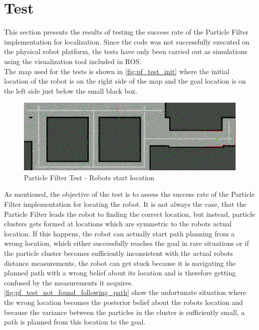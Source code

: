 
\section{Test} %
\label{sec:test}

This section presents the results of testing the success rate of the Particle Filter implementation for localization. Since the code was not successfully executed on the physical robot platform, the tests have only been carried out as simulations using the visualization tool included in ROS.\\

The map used for the tests is shown in \autoref{fig:pf_test_init} where the initial location of the robot is on the right side of the map and the goal location is on the left side just below the small black box.\\

\begin{figure}[H]
\centering
\includegraphics[scale=0.45]{images/pf_test_init}
\caption{Particle Filter Test - Robots start location}
\label{fig:pf_test_init}
\end{figure}

As mentioned, the objective of the test is to assess the success rate of the Particle Filter implementation for locating the robot. It is not always the case, that the Particle Filter leads the robot to finding the correct location, but instead, particle clusters gets formed at locations which are symmetric to the robots actual location. If this happens, the robot can actually start path planning from a wrong location, which either successfully reaches the goal in rare situations or if the particle cluster becomes sufficiently inconsistent with the actual robots distance measurements, the robot can get stuck because it is navigating the planned path with a wrong belief about its location and is therefore getting confused by the measurements it acquires.\\

\autoref{fig:pf_test_not_found_following_path} show the unfortunate situation where the wrong location becomes the posterior belief about the robots location and because the variance between the particles in the cluster is sufficiently small, a path is planned from this location to the goal.


